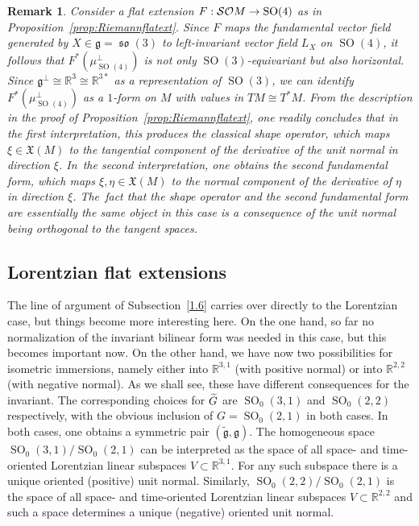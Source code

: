 \documentclass[10pt,a4paper]{amsart}
\DeclareMathOperator{\SO}{SO}
\DeclareMathOperator{\fkso}{\mathfrak{so}}
\newcommand*{\R}{\mathbb{R}}
\newcommand{\tfg}{\widetilde{\mathfrak g}}
\newcommand{\fkg}{\mathfrak{g}}
\newcommand{\fkX}{\mathfrak{X}}
\newcommand{\clSO}{\mathcal{SO}}
\renewcommand*{\to}{\mathchoice{\longrightarrow}{\rightarrow}{\rightarrow}{\rightarrow}}
\let\oldtilde\tilde
\renewcommand*{\tilde}[1]{\mathchoice{\widetilde{#1}}{\widetilde{#1}}{\oldtilde{#1}}{\oldtilde{#1}}}
\newtheorem{rema}[theo]{Remark}
\theoremstyle{definition}\newtheorem{defi}[theo]{Definition}
\begin{document}
\begin{rema}\label{rem:Rieman}
Consider a flat extension $F:\clSO M\to \SO(4)$ as in Proposition~\ref{prop:Riemannflatext}. Since $F$ maps the fundamental vector field generated by $X\in\fkg=\fkso(3)$ to left-invariant vector field $L_X$ on $\SO(4)$, it follows that $F^*(\mu_{\SO(4)}^\perp)$ is not only $\SO(3)$-equivariant but also horizontal. Since $\fkg^\perp\cong\R^3\cong\R^{3*}$ as a representation of $\SO(3)$, we can identify $F^*(\mu_{\SO(4)}^\perp)$ as a $1$-form on $M$ with values in $TM\cong T^*M$. From the description in the proof of Proposition~\ref{prop:Riemannflatext}, one readily concludes that in the first interpretation, this produces the classical \emph{shape operator}, which maps $\xi\in\fkX(M)$ to the tangential component of the derivative of the unit normal in direction $\xi$. In~the second interpretation, one obtains the \emph{second fundamental form}, which maps $\xi,\eta\in\fkX(M)$ to the normal component of the derivative of $\eta$ in direction $\xi$. The~fact that the shape operator and the second fundamental form are essentially the same object in this case is a consequence of the unit normal being orthogonal to the tangent spaces.
\end{rema}

\subsection{Lorentzian flat extensions}\label{1.7}

The line of argument of Subsection~\ref{1.6} carries over directly to the Lorentzian case, but things become more interesting here. On the one hand, so far no normalization of the invariant bilinear form was needed in this case, but this becomes important now. On the other hand, we have now two possibilities for isometric immersions, namely either into $\R^{3,1}$ (with positive normal) or into $\R^{2,2}$ (with negative normal). As we shall see, these have different consequences for the invariant. The corresponding choices for $\tilde G$ are $\SO_0(3,1)$ and $\SO_0(2,2)$ respectively, with the obvious inclusion of $G=\SO_0(2,1)$ in both cases. In both cases, one obtains a symmetric pair $(\tfg,\fkg)$. The homogeneous space $\SO_0(3,1)/\SO_0(2,1)$ can be interpreted as the space of all space- and time-oriented Lorentzian linear subspaces $V\subset\R^{3,1}$. For any such subspace there is a unique oriented (positive) unit normal. Similarly, $\SO_0(2,2)/\SO_0(2,1)$ is the space of all space- and time-oriented Lorentzian linear subspaces $V\subset\R^{2,2}$ and such a space determines a unique (negative) oriented unit normal.
\end{document}
